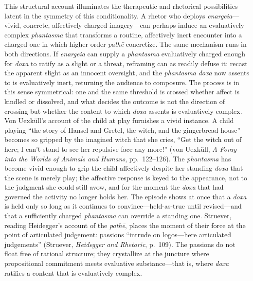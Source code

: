 This structural account illuminates the therapeutic and rhetorical possibilities latent in the symmetry of this conditionality. A rhetor who deploys \textit{enargeia}---vivid, concrete, affectively charged imagery---can perhaps induce an evaluatively complex \textit{phantasma} that transforms a routine, affectively inert encounter into a charged one in which higher-order \textit{pathē} concretize. The same mechanism runs in both directions. If \textit{enargeia} can supply a \textit{phantasma} evaluatively charged enough for \textit{doxa} to ratify as a slight or a threat, reframing can as readily defuse it: recast the apparent slight as an innocent oversight, and the \textit{phantasma} \textit{doxa} now assents to is evaluatively inert, returning the audience to composure. The process is in this sense symmetrical: one and the same threshold is crossed whether affect is kindled or dissolved, and what decides the outcome is not the direction of crossing but whether the content to which \textit{doxa} assents is evaluatively complex. Von Uexküll's account of the child at play furnishes a vivid instance. A child playing ``the story of Hansel and Gretel, the witch, and the gingerbread house'' becomes so gripped by the imagined witch that she cries, ``Get the witch out of here; I can't stand to see her repulsive face any more!'' (von Uexküll, \textit{A Foray into the Worlds of Animals and Humans}, pp.~122--126). The \textit{phantasma} has become vivid enough to grip the child affectively despite her standing \textit{doxa} that the scene is merely play; the affective response is keyed to the appearance, not to the judgment she could still avow, and for the moment the \textit{doxa} that had governed the activity no longer holds her. The episode shows at once that a \textit{doxa} is held only so long as it continues to convince---held-as-true until revised---and that a sufficiently charged \textit{phantasma} can override a standing one. Struever, reading Heidegger's account of the \textit{pathē}, places the moment of their force at the point of articulated judgement: passions ``intrude on logos---here articulated judgements'' (Struever, \textit{Heidegger and Rhetoric}, p.~109). The passions do not float free of rational structure; they crystallize at the juncture where propositional commitment meets evaluative substance---that is, where \textit{doxa} ratifies a content that is evaluatively complex.

